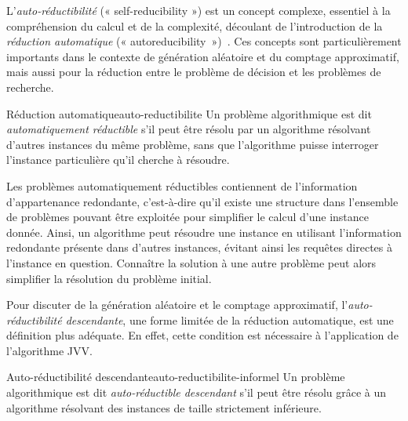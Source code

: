 L'\textit{auto-réductibilité} (« self-reducibility ») est un concept complexe, essentiel à la compréhension du calcul et de la complexité, découlant de l'introduction de la \textit{réduction automatique} (« autoreducibility »)~\cite{trakhtenbrotAutoreducibility1970, selkeAutoreducibilityFriendsMeasuring2006}. Ces concepts sont particulièrement importants dans le contexte de génération aléatoire et du comptage approximatif, mais aussi pour la réduction entre le problème de décision et les problèmes de recherche.


\begin{subdefinition}{Réduction automatique}{auto-reductibilite}
    Un problème algorithmique est dit \textit{automatiquement réductible} s'il peut être résolu par un algorithme résolvant d'autres instances du même problème, sans que l'algorithme puisse interroger l'instance particulière qu'il cherche à résoudre.
\end{subdefinition}

Les problèmes automatiquement réductibles contiennent de l'information d'appartenance redondante, c'est-à-dire qu'il existe une structure dans l'ensemble de problèmes pouvant être exploitée pour simplifier le calcul d'une instance donnée. Ainsi, un algorithme peut résoudre une instance en utilisant l'information redondante présente dans d'autres instances, évitant ainsi les requêtes directes à l'instance en question. Connaître la solution à une autre problème peut alors simplifier la résolution du problème initial. 


Pour discuter de la génération aléatoire et le comptage approximatif, l'\textit{auto-réductibilité descendante}, une forme limitée de la réduction automatique, est une définition plus adéquate. En effet, cette condition est nécessaire à l'application de l'algorithme JVV.

\begin{maindefinition}{Auto-réductibilité descendante}{auto-reductibilite-informel}
    Un problème algorithmique est dit \textit{auto-réductible descendant} s'il peut être résolu grâce à un algorithme résolvant des instances de taille strictement inférieure.
\end{maindefinition}


